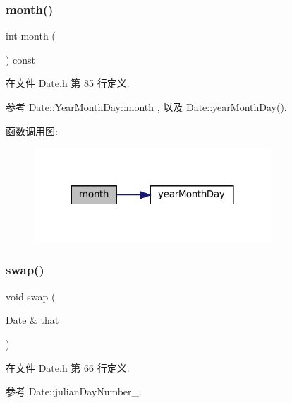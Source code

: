 \subsubsection{\texorpdfstring{month()}{month()}}
{\footnotesize\ttfamily int month (\begin{DoxyParamCaption}{ }\end{DoxyParamCaption}) const\hspace{0.3cm}{\ttfamily [inline]}}



在文件 Date.\+h 第 85 行定义.



参考 Date\+::\+Year\+Month\+Day\+::month , 以及 Date\+::year\+Month\+Day().

函数调用图\+:
\nopagebreak
\begin{figure}[H]
\begin{center}
\leavevmode
\includegraphics[width=252pt]{classmuduo_1_1Date_a9418bae7320038816691fbb13ce3b90a_cgraph}
\end{center}
\end{figure}
\mbox{\label{classmuduo_1_1Date_aaedebe3a1effa7b1145ea3b56dbb036a}} 
\subsubsection{\texorpdfstring{swap()}{swap()}}
{\footnotesize\ttfamily void swap (\begin{DoxyParamCaption}\item[{\hyperlink{classmuduo_1_1Date}{Date} \&}]{that }\end{DoxyParamCaption})\hspace{0.3cm}{\ttfamily [inline]}}



在文件 Date.\+h 第 66 行定义.



参考 Date\+::julian\+Day\+Number\+\_\+.

\mbox{\label{classmuduo_1_1Date_aa9bd4dc5b8cade6a8e0c8e1a613b6d39}} 
